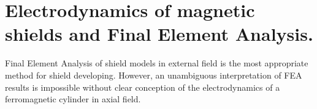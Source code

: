 \documentclass[12pt]{article}
\begin{document}


\pagebreak
\newpage
\section{Electrodynamics of   magnetic shields  and Final Element Analysis.}
\label{ednmics}
Final Element Analysis of shield models in external field  is the most appropriate method for shield developing.
However, an unambiguous interpretation of  FEA results  is impossible without clear  conception of  the    
electrodynamics of a ferromagnetic  cylinder in axial field.
\end{document}
